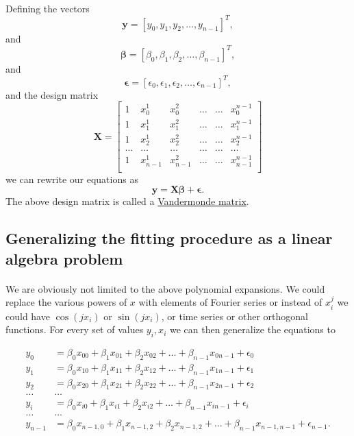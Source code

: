 \documentclass[%
oneside,                 %
final,                   %
10pt]{article}
\begin{document}
\paragraph{}
Defining the vectors
\[
\bm{y} = [y_0,y_1, y_2,\dots, y_{n-1}]^T,
\]
and
\[
\bm{\beta} = [\beta_0,\beta_1, \beta_2,\dots, \beta_{n-1}]^T,
\]
and
\[
\bm{\epsilon} = [\epsilon_0,\epsilon_1, \epsilon_2,\dots, \epsilon_{n-1}]^T,
\]
and the design matrix
\[
\bm{X}=
\begin{bmatrix} 
1& x_{0}^1 &x_{0}^2& \dots & \dots &x_{0}^{n-1}\\
1& x_{1}^1 &x_{1}^2& \dots & \dots &x_{1}^{n-1}\\
1& x_{2}^1 &x_{2}^2& \dots & \dots &x_{2}^{n-1}\\                      
\dots& \dots &\dots& \dots & \dots &\dots\\
1& x_{n-1}^1 &x_{n-1}^2& \dots & \dots &x_{n-1}^{n-1}\\
\end{bmatrix} 
\]
we can rewrite our equations as
\[
\bm{y} = \bm{X}\bm{\beta}+\bm{\epsilon}.
\]
The above design matrix is called a \href{{https://en.wikipedia.org/wiki/Vandermonde_matrix}}{Vandermonde matrix}.




\subsection*{Generalizing the fitting procedure as a linear algebra problem}

\paragraph{}

We are obviously not limited to the above polynomial expansions.  We
could replace the various powers of $x$ with elements of Fourier
series or instead of $x_i^j$ we could have $\cos{(j x_i)}$ or $\sin{(j
x_i)}$, or time series or other orthogonal functions.  For every set
of values $y_i,x_i$ we can then generalize the equations to

\begin{align*}
y_0&=\beta_0x_{00}+\beta_1x_{01}+\beta_2x_{02}+\dots+\beta_{n-1}x_{0n-1}+\epsilon_0\\
y_1&=\beta_0x_{10}+\beta_1x_{11}+\beta_2x_{12}+\dots+\beta_{n-1}x_{1n-1}+\epsilon_1\\
y_2&=\beta_0x_{20}+\beta_1x_{21}+\beta_2x_{22}+\dots+\beta_{n-1}x_{2n-1}+\epsilon_2\\
\dots & \dots \\
y_{i}&=\beta_0x_{i0}+\beta_1x_{i1}+\beta_2x_{i2}+\dots+\beta_{n-1}x_{in-1}+\epsilon_i\\
\dots & \dots \\
y_{n-1}&=\beta_0x_{n-1,0}+\beta_1x_{n-1,2}+\beta_2x_{n-1,2}+\dots+\beta_{n-1}x_{n-1,n-1}+\epsilon_{n-1}.\\
\end{align*}
\end{document}
